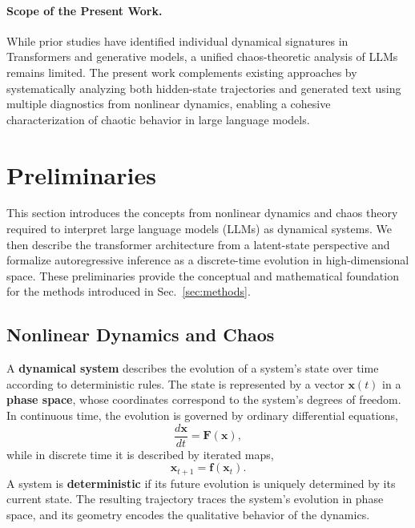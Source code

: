 \documentclass[aip%
 aip,
 amsmath,amssymb,
 reprint,%
]{revtex4-1}
\begin{document}
\paragraph{Scope of the Present Work.}

While prior studies have identified individual dynamical signatures in Transformers and generative models, a unified chaos-theoretic analysis of LLMs remains limited. The present work complements existing approaches by systematically analyzing both hidden-state trajectories and generated text using multiple diagnostics from nonlinear dynamics, enabling a cohesive characterization of chaotic behavior in large language models.

\section{Preliminaries}
\label{sec:preliminaries}

This section introduces the concepts from nonlinear dynamics and chaos theory required to interpret large language models (LLMs) as dynamical systems. We then describe the transformer architecture from a latent-state perspective and formalize autoregressive inference as a discrete-time evolution in high-dimensional space. These preliminaries provide the conceptual and mathematical foundation for the methods introduced in Sec.~\ref{sec:methods}.

\subsection{Nonlinear Dynamics and Chaos}
\label{subsec:nonlinear_dynamics}

A \textbf{dynamical system} describes the evolution of a system’s state over time according to deterministic rules. The state is represented by a vector $\mathbf{x}(t)$ in a \textbf{phase space}, whose coordinates correspond to the system’s degrees of freedom. In continuous time, the evolution is governed by ordinary differential equations,
\begin{equation}
\frac{d\mathbf{x}}{dt} = \mathbf{F}(\mathbf{x}),
\end{equation}
while in discrete time it is described by iterated maps,
\begin{equation}
\mathbf{x}_{t+1} = \mathbf{f}(\mathbf{x}_t).
\end{equation}
A system is \textbf{deterministic} if its future evolution is uniquely determined by its current state. The resulting trajectory traces the system’s evolution in phase space, and its geometry encodes the qualitative behavior of the dynamics.
\end{document}
